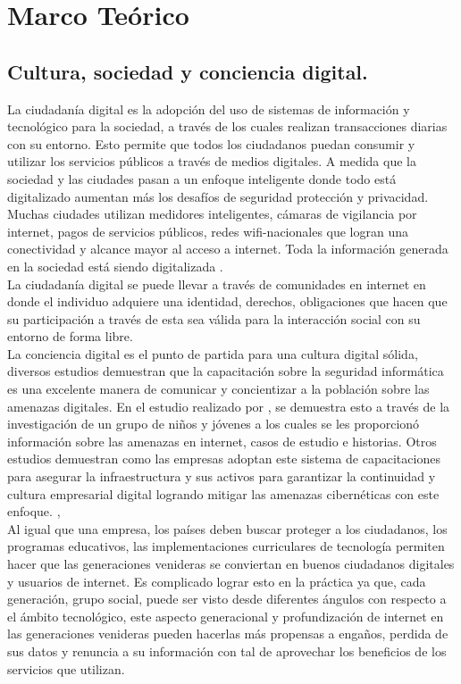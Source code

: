 \chapter{Marco Teórico}\label{cap:capitulo_2}

\section{Cultura, sociedad y conciencia digital.}\label{section:Cultura, sociedad y conciencia digital.}
La ciudadanía digital es la adopción del uso de sistemas de información y tecnológico para la sociedad, a través de los cuales realizan transacciones diarias con su entorno. Esto permite que todos los ciudadanos puedan consumir y utilizar los servicios públicos a través de medios digitales\cite{Popkova2020}.
A medida que la sociedad y las ciudades pasan a un enfoque inteligente donde todo está digitalizado aumentan más los desafíos de seguridad protección y privacidad. Muchas ciudades utilizan medidores inteligentes, cámaras de vigilancia por internet, pagos de servicios públicos, redes wifi-nacionales que logran una conectividad y alcance mayor al acceso a internet. Toda la información generada en la sociedad está siendo digitalizada \cite{Konkolewsky2017}. \\
La ciudadanía digital se puede llevar a través de comunidades en internet en donde el individuo adquiere una identidad, derechos, obligaciones que hacen que su participación a través de esta sea válida para la interacción social con su entorno de forma libre\cite{Popkova2020}. \\
La conciencia digital es el punto de partida para una cultura digital sólida, diversos estudios demuestran que la capacitación sobre la seguridad informática es una excelente manera de comunicar y concientizar a la población sobre las amenazas digitales. En el estudio realizado por \cite{Lyon2017}, se demuestra esto a través de la investigación de un grupo de niños y jóvenes a los cuales se les proporcionó información sobre las amenazas en internet, casos de estudio e historias. Otros estudios demuestran como las empresas adoptan este sistema de capacitaciones para asegurar la infraestructura y sus activos para garantizar la continuidad y cultura empresarial digital logrando mitigar las amenazas cibernéticas con este enfoque. \cite{Li2021}, \cite{RobGord} \\
Al igual que una empresa, los países deben buscar proteger a los ciudadanos, los programas educativos, las implementaciones curriculares de tecnología permiten hacer que las generaciones venideras se conviertan en buenos ciudadanos digitales y usuarios de internet. Es complicado lograr esto en la práctica ya que, cada generación, grupo social, puede ser visto desde diferentes ángulos con respecto a el ámbito tecnológico, este aspecto generacional y profundización de internet en las generaciones venideras pueden hacerlas más propensas a engaños, perdida de sus datos y renuncia a su información con tal de aprovechar los beneficios de los servicios que utilizan\cite{Zurizazi}. \\
